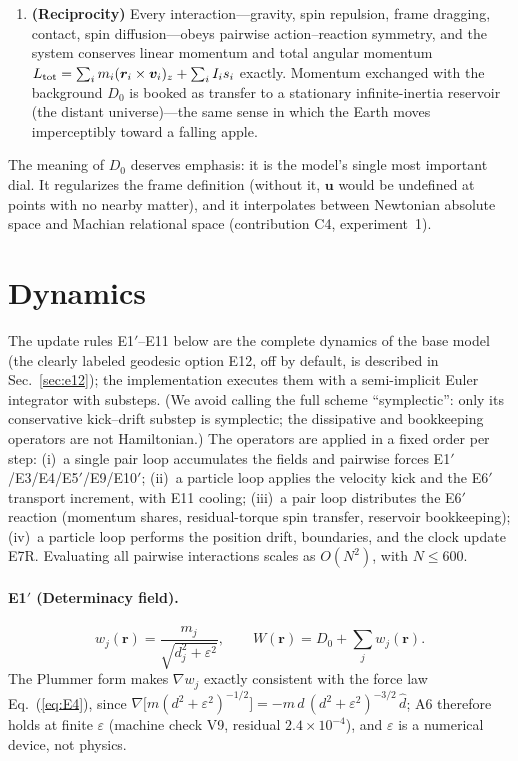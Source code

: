 \documentclass[aps,reprint,amsmath,amssymb,nofootinbib,superscriptaddress,floatfix]{revtex4-2}
\newcommand{\vect}[1]{\bm{#1}}
\newcommand{\Dz}{D_0}
\begin{document}
\begin{enumerate}
\item[A13.]{\bf (Reciprocity)} Every interaction---gravity, spin
repulsion, frame dragging, contact, spin diffusion---obeys pairwise
action--reaction symmetry, and the system conserves
linear momentum and total angular momentum
$L_{\rm tot} = \sum_i m_i(\vect{r}_i\times\vect{v}_i)_z
 + \sum_i I_i s_i$ exactly.
Momentum exchanged with the background $\Dz$ is booked as transfer to
a stationary infinite-inertia reservoir (the distant universe)---the
same sense in which the Earth moves imperceptibly toward a falling
apple.
\end{enumerate}

The meaning of $\Dz$ deserves emphasis: it is the model's single most
important dial.
It regularizes the frame definition (without it, $\vect{u}$ would be
undefined at points with no nearby matter), and it interpolates between
Newtonian absolute space and Machian relational space
(contribution C4, experiment~1).

\section{Dynamics}
\label{sec:dynamics}

The update rules E1$'$--E11 below are the complete dynamics of the
base model (the clearly labeled geodesic option E12, off by default,
is described in Sec.~\ref{sec:e12}); the implementation executes them
with a semi-implicit Euler integrator with substeps.
(We avoid calling the full scheme ``symplectic'': only its conservative
kick--drift substep is symplectic; the dissipative and bookkeeping
operators are not Hamiltonian.)
The operators are applied in a fixed order per step:
(i)~a single pair loop accumulates the fields and pairwise forces
E1$'$/E3/E4/E5$'$/E9/E10$'$;
(ii)~a particle loop applies the velocity kick and the E6$'$ transport
increment, with E11 cooling;
(iii)~a pair loop distributes the E6$'$ reaction (momentum shares,
residual-torque spin transfer, reservoir bookkeeping);
(iv)~a particle loop performs the position drift, boundaries, and the
clock update E7R.
Evaluating all pairwise interactions scales as $O(N^2)$, with
$N \le 600$.

\paragraph*{E1$'$ (Determinacy field).}
\begin{equation}
w_j(\vect{r}) = \frac{m_j}{\sqrt{d_j^2+\varepsilon^2}},\qquad
W(\vect{r}) = \Dz + \sum_j w_j(\vect{r}).
\label{eq:E1}
\end{equation}
The Plummer form makes $\nabla w_j$ exactly consistent with the force
law Eq.~(\ref{eq:E4}), since
$\nabla\bigl[m(d^2+\varepsilon^2)^{-1/2}\bigr]
 = -m\,d\,(d^2+\varepsilon^2)^{-3/2}\,\hat{d}$; A6 therefore holds at
finite $\varepsilon$
(machine check V9, residual $2.4\times10^{-4}$), and $\varepsilon$ is
a numerical device, not physics.
\end{document}
